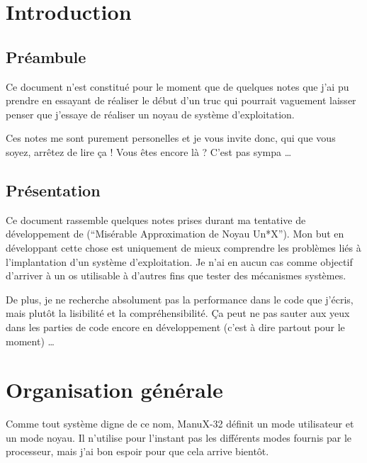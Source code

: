 %
\section{Introduction}

\subsection{Préambule}
   Ce document n'est constitué pour le moment que de quelques notes
que j'ai pu prendre en essayant de réaliser le début d'un truc qui pourrait
vaguement laisser penser que j'essaye de réaliser un noyau de système
d'exploitation. 

   Ces notes me sont purement personelles et je vous invite donc, qui que
vous soyez, arrêtez de lire ça ! Vous êtes encore là ? C'est pas sympa \ldots

%
\subsection{Présentation}

   Ce document rassemble quelques notes prises durant ma tentative de
dévelop\-pement de \manux (``Misérable Approximation de Noyau
Un*X''). Mon but en développant cette chose est uniquement de mieux
comprendre les problèmes liés à l'implantation d'un système
d'exploitation. Je n'ai en aucun cas comme objectif d'arriver à un
{\sc os} utilisable à d'autres fins que tester des mécanismes
systèmes. 

   De plus, je ne recherche absolument pas la performance dans le code 
que j'écris, mais plutôt la lisibilité et la compréhensibilité. Ça
peut ne pas sauter aux yeux dans les parties de code encore en
développement (c'est à dire partout pour le moment) \ldots 

\section{Organisation générale}

   Comme tout système digne de ce nom, ManuX-32 définit un mode
utilisateur et un mode noyau. Il n'utilise pour l'instant pas les
différents modes fournis par le processeur, mais j'ai bon espoir pour
que cela arrive bientôt.

